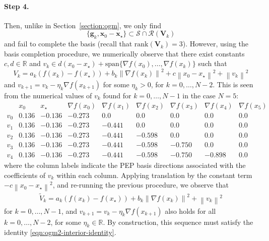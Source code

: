 \documentclass{article}
\theoremstyle{definition}
\theoremstyle{plain}
\newcommand{\vg}{{\mathbf{g}}}
\newcommand{\vx}{{\mathbf{x}}}
\newcommand{\vV}{{\mathbf{V}}}
\newcommand{\cR}{{\mathcal{R}}}
\newcommand{\cS}{{\mathcal{S}}}
\newcommand{\reals}{\mathbb{R}}
\newcommand{\sqnorm}[1]{\left\| #1 \right\|^2}
\newcommand{\norm}[1]{\left\|#1\right\|}
\begin{document}
\paragraph{Step 4.} Then, unlike in Section~\ref{section:ogm}, we only find
\[
    \{ \vg_k, \vx_0 - \vx_\star \} \subset \cS \cap \cR(\vV_k)
\]
and fail to complete the basis (recall that $\mathrm{rank}(\vV_k) = 3$).
However, using the basis completion procedure, we numerically observe that there exist constants $c,d\in \reals$ and $v_{k} \in d(x_0 - x_\star) + \mathrm{span}\{\nabla f(x_0), \dots, \nabla f(x_{k})\}$ such that
\begin{equation*}
    V_k = a_k (f(x_k) - f(x_{\star})) + b_k \norm{ \nabla f(x_k) }^2 + c \sqnorm{x_0 - x_\star} + \norm{ v_{k} }^2
\end{equation*}
and $v_{k+1} = v_{k} - \eta_{k} \nabla f(x_{k+1})$ for some $\eta_{k} > 0$, for $k=0,\dots,N-2$.
This is seen from the numerical values of $v_k$ found for $k=0,\dots,N-1$ in the case $N=5$:
\[
\begin{array}{c|rrrrrrrr}
 & x_0 & x_\star & \nabla f(x_0) & \nabla f(x_1) & \nabla f(x_2) & \nabla f(x_3) & \nabla f(x_4) & \nabla f(x_5) \\
\hline
v_0 & 0.136 & -0.136 & -0.273 & 0.0 & 0.0 & 0.0 & 0.0 & 0.0 \\
v_1 & 0.136 & -0.136 & -0.273 & -0.441 & 0.0 & 0.0 & 0.0 & 0.0 \\
v_2 & 0.136 & -0.136 & -0.273 & -0.441 & -0.598 & 0.0 & 0.0 & 0.0 \\
v_3 & 0.136 & -0.136 & -0.273 & -0.441 & -0.598 & -0.750 & 0.0 & 0.0 \\
v_4 & 0.136 & -0.136 & -0.273 & -0.441 & -0.598 & -0.750 & -0.898 & 0.0
\end{array}
\]
where the column labels indicate the PEP basis directions associated with the coefficients of $v_k$ within each column.
Applying translation by the constant term $-c\sqnorm{x_0 - x_\star}$, and re-running the previous procedure, we observe that
\begin{align}
\label{eqn:ogm-without-z-lyapunov-skeleton}
    \widetilde V_k = a_k (f(x_k) - f(x_{\star})) + b_k \norm{ \nabla f(x_k) }^2 + \norm{ v_{k} }^2 
\end{align}
for $k=0,\dots,N-1$, and $v_{k+1} = v_k - \eta_k \nabla f(x_{k+1})$ also holds for all $k=0,\dots,N-2$, for some $\eta_k \in \reals$.
By construction, this sequence must satisfy the identity \eqref{eqn:ogm2-interior-identity}.
\end{document}
